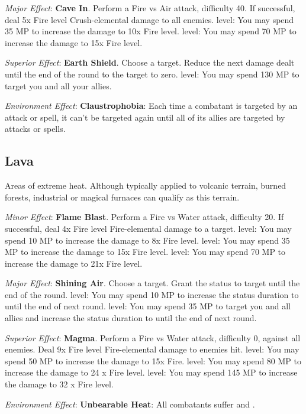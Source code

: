\begin{multicols}{2}
\textit{Major Effect}: \textbf{Cave In}. Perform a Fire vs Air attack, difficulty 40. If successful, deal 5x Fire level Crush-elemental damage to all enemies.  level: You may spend 35 MP to increase the damage to 10x Fire level.  level: You may spend 70 MP to increase the damage to 15x Fire level.

\textit{Superior Effect}: \textbf{Earth Shield}. Choose a target. Reduce the next damage dealt until the end of the round to the target to zero.  level: You may spend 130 MP to target you and all your allies.

\textit{Environment Effect}: \textbf{Claustrophobia}: Each time a combatant is targeted by an attack or spell, it can't be targeted again until all of its allies are targeted by attacks or spells.

\subsection*{Lava}\label{subsec:geo-lava}
Areas of extreme heat. Although typically applied to volcanic terrain, burned forests, industrial or magical furnaces can qualify as this terrain.

\textit{Minor Effect}: \textbf{Flame Blast}. Perform a Fire vs Water attack, difficulty 20. If successful, deal 4x Fire level Fire-elemental damage to a target.  level: You may spend 10 MP to increase the damage to 8x Fire level.  level: You may spend 35 MP to increase the damage to 15x Fire level.  level: You may spend 70 MP to increase the damage to 21x Fire level.

\textit{Major Effect}: \textbf{Shining Air}. Choose a target. Grant the  status to target until the end of the round.  level: You may spend 10 MP to increase the status duration to until the end of next round. level: You may spend 35 MP to target you and all allies and increase the status duration to until the end of next round.

\textit{Superior Effect}: \textbf{Magma}. Perform a Fire vs Water attack, difficulty 0, against all enemies. Deal 9x Fire level Fire-elemental damage to enemies hit.  level: You may spend 50 MP to increase the damage to 15x Fire.  level: You may spend 80 MP to increase the damage to 24 x Fire level.  level: You may spend 145 MP to increase the damage to 32 x Fire level.

\textit{Environment Effect}: \textbf{Unbearable Heat}: All combatants suffer  and .


\end{multicols}
